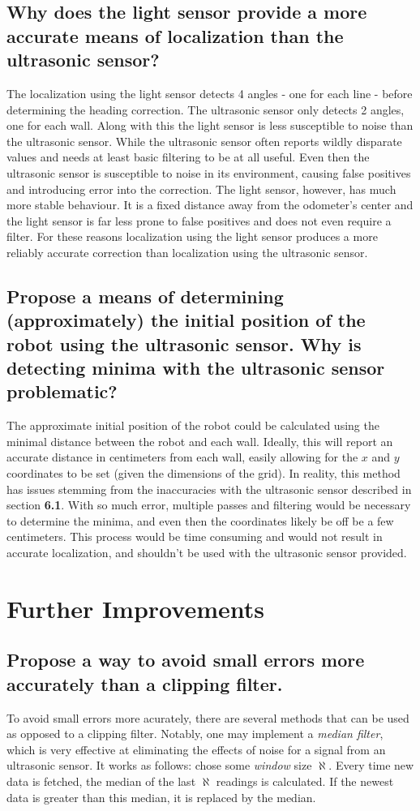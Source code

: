 \documentclass[11pt]{article}
\begin{document}
\subsection{Why does the light sensor provide a more accurate means of localization than the
ultrasonic sensor?}
\par The localization using the light sensor detects 4 angles - one for each line - before
determining the heading correction. The ultrasonic sensor only detects 2 angles, one for each wall.
Along with this the light sensor is less susceptible to noise than the ultrasonic sensor. While the
ultrasonic sensor often reports wildly disparate values and needs at least basic filtering to be at
all useful. Even then the ultrasonic sensor is susceptible to noise in its environment, causing
false positives and introducing error into the correction. The light sensor, however, has much more
stable behaviour. It is a fixed distance away from the odometer's center and the light sensor is far
less prone to false positives and does not even require a filter. For these reasons localization
using the light sensor produces a more reliably accurate correction than localization using the
ultrasonic sensor.
\subsection{Propose a means of determining (approximately) the initial position of the robot using
the ultrasonic sensor. Why is detecting minima with the ultrasonic sensor problematic?}
\par The approximate initial position of the robot could be calculated using the minimal distance
between the robot and each wall. Ideally, this will report an accurate distance in centimeters from
each wall, easily allowing for the $x$ and $y$ coordinates to be set (given the dimensions of the grid).
In reality, this method has issues
stemming from the inaccuracies with the ultrasonic sensor described in section \textbf{6.1}. With so
much error, multiple passes and filtering would be necessary to determine the minima, and even then
the coordinates likely be off be a few centimeters. This process would be time consuming and would
not result in accurate localization, and shouldn't be used with the ultrasonic sensor provided.

\section{Further Improvements}
\subsection{Propose a way to avoid small errors more accurately than a clipping filter.}
To avoid small errors more acurately, there are several methods that can be used as opposed to a
clipping filter. Notably, one may implement a \textit{median filter}, which is very effective at
eliminating the effects of noise for a signal from an ultrasonic sensor. It works as follows: chose
some \textit{window} size $\aleph$. Every time new data is fetched, the median of the last $\aleph$
readings is calculated. If the newest data is greater than this median, it is replaced by the
median.
\end{document}
